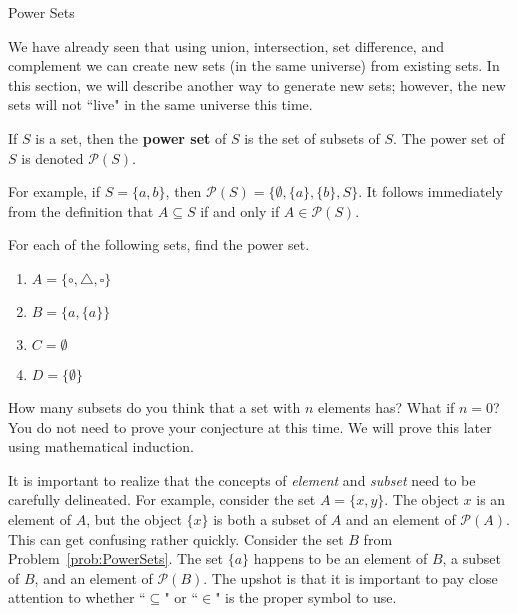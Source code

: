 \begin{section}{Power Sets}\label{sec:PowerSets}

We have already seen that using union, intersection, set difference, and complement we can create new sets (in the same universe) from existing sets.  In this section, we will describe another way to generate new sets; however, the new sets will not ``live" in the same universe this time.

\begin{definition}
If $S$ is a set, then the \textbf{power set} of $S$ is the set of subsets of $S$.  The power set of $S$ is denoted $\boxed{\mathcal{P}(S)}$.
\end{definition}

For example, if $S=\{a,b\}$, then $\mathcal{P}(S)=\{\emptyset, \{a\}, \{b\}, S\}$. It follows immediately from the definition that $A\subseteq S$ if and only if $A\in\mathcal{P}(S)$. 
 
\begin{problem}\label{prob:PowerSets}
For each of the following sets, find the power set.
\begin{multicols}{2}
\begin{enumerate}[label=\textrm{(\alph*)}]
\item $A=\{\circ, \triangle, \square\}$
\item $B=\{a,\{a\}\}$
\item $C=\emptyset$
\item $D=\{\emptyset\}$
\end{enumerate}
\end{multicols}
\end{problem}

\begin{problem}\label{conjecture:PowerSets}
How many subsets do you think that a set with $n$ elements has?  What if $n=0$?  You do not need to prove your conjecture at this time.  We will prove this later using mathematical induction.
\end{problem}

It is important to realize that the concepts of \emph{element} and \emph{subset} need to be carefully delineated.  For example, consider the set $A=\{x,y\}$.  The object $x$ is an element of $A$, but the object $\{x\}$ is both a subset of $A$ and an element of $\mathcal{P}(A)$.  This can get confusing rather quickly.  Consider the set $B$ from Problem~\ref{prob:PowerSets}.  The set $\{a\}$ happens to be an element of $B$, a subset of $B$, and an element of  $\mathcal{P}(B)$. The upshot is that it is important to pay close attention to whether ``$\subseteq$" or ``$\in$" is the proper symbol to use.


\end{section}
